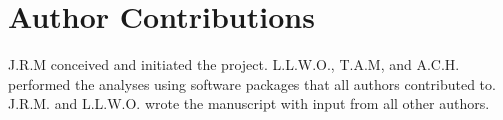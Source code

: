 \documentclass[11pt]{article}
\begin{document}
\section*{Author Contributions} J.R.M conceived and initiated the project.
L.L.W.O., T.A.M, and A.C.H. performed the analyses using software packages that
all authors contributed to. J.R.M. and L.L.W.O. wrote the manuscript with input
from all other authors.



\end{document}

